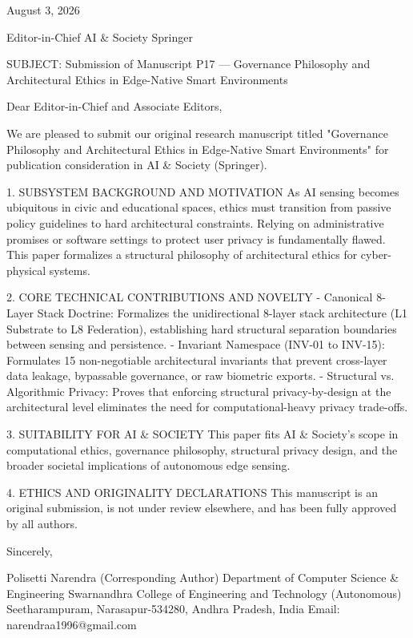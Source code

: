August 3, 2026

Editor-in-Chief
AI & Society
Springer

SUBJECT: Submission of Manuscript P17 — Governance Philosophy and Architectural Ethics in Edge-Native Smart Environments

Dear Editor-in-Chief and Associate Editors,

We are pleased to submit our original research manuscript titled "Governance Philosophy and Architectural Ethics in Edge-Native Smart Environments" for publication consideration in AI & Society (Springer).

1. SUBSYSTEM BACKGROUND AND MOTIVATION
As AI sensing becomes ubiquitous in civic and educational spaces, ethics must transition from passive policy guidelines to hard architectural constraints. Relying on administrative promises or software settings to protect user privacy is fundamentally flawed. This paper formalizes a structural philosophy of architectural ethics for cyber-physical systems.

2. CORE TECHNICAL CONTRIBUTIONS AND NOVELTY
  - Canonical 8-Layer Stack Doctrine: Formalizes the unidirectional 8-layer stack architecture (L1 Substrate to L8 Federation), establishing hard structural separation boundaries between sensing and persistence.
  - Invariant Namespace (INV-01 to INV-15): Formulates 15 non-negotiable architectural invariants that prevent cross-layer data leakage, bypassable governance, or raw biometric exports.
  - Structural vs. Algorithmic Privacy: Proves that enforcing structural privacy-by-design at the architectural level eliminates the need for computational-heavy privacy trade-offs.

3. SUITABILITY FOR AI & SOCIETY
This paper fits AI & Society's scope in computational ethics, governance philosophy, structural privacy design, and the broader societal implications of autonomous edge sensing.

4. ETHICS AND ORIGINALITY DECLARATIONS
This manuscript is an original submission, is not under review elsewhere, and has been fully approved by all authors.

Sincerely,

Polisetti Narendra (Corresponding Author)
Department of Computer Science & Engineering
Swarnandhra College of Engineering and Technology (Autonomous)
Seetharampuram, Narasapur-534280, Andhra Pradesh, India
Email: narendraa1996@gmail.com
